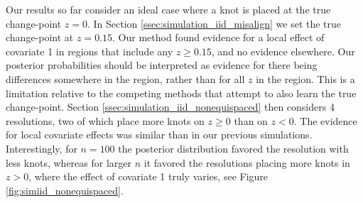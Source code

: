Our results so far consider an ideal case where a knot is placed at the true change-point $z=0$. 
In Section \ref{ssec:simulation_iid_misalign} we set the true change-point at $z=0.15$.
Our method found evidence for a local effect of covariate 1 in regions that include any $z \geq 0.15$, and no evidence elsewhere.
Our posterior probabilities should be interpreted as evidence for there being differences somewhere in the region, rather than for all $z$ in the region. This is a limitation relative to the competing methods that attempt to also learn the true change-point.
Section \ref{ssec:simulation_iid_nonequispaced} then considers 4 resolutions, two of which place more knots on $z \geq 0$ than on $z<0$.
The evidence for local covariate effects was similar than in our previous simulations.
Interestingly, for $n=100$ the posterior distribution favored the resolution with less knots, whereas for larger $n$ it favored the resolutions placing more knots in $z>0$, where the effect of covariate 1 truly varies, see Figure \ref{fig:simiid_nonequispaced}.


